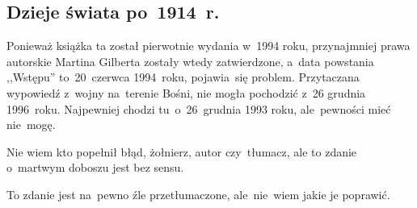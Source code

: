 \documentclass[a4paper,11pt]{article}
\begin{document}
\vspace{\spaceTwo}





\subsection{Dzieje świata po~1914~r.}

\vspace{\spaceThree}






\start {} Ponieważ książka ta został pierwotnie wydania
w~1994 roku, przynajmniej prawa autorskie Martina Gilberta zostały
wtedy zatwierdzone, a~data powstania ,,Wstępu'' to~20~czerwca
1994~roku, pojawia~się problem. Przytaczana wypowiedź z~wojny
na~terenie Bośni, nie mogła pochodzić z~26 grudnia 1996~roku.
Najpewniej chodzi tu~o~26~grudnia 1993 roku, ale~pewności mieć
nie~mogę.

\vspace{\spaceFour}


\start {} Nie wiem kto popełnił błąd, żołnierz, autor
czy~tłumacz, ale to zdanie o~martwym doboszu jest bez sensu.

\vspace{\spaceFour}


\start {} To zdanie jest na~pewno źle przetłumaczone,
ale~nie~wiem jakie je poprawić.
\end{document}
